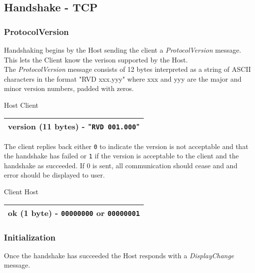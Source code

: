 \documentclass{article}
\begin{document}
    \subsection{Handshake - TCP}

    \subsubsection{ProtocolVersion}
    Handshaking begins by the Host sending the client a \emph{ProtocolVersion} message. This lets the Client know the verison supported by the Host.\\

    The \emph{ProtocolVersion} message consists of 12 bytes interpreted as a string of ASCII characters in the format "RVD xxx.yyy" where xxx and yyy are the major and minor version numbers, padded with zeros.

    \begin{center}
        Host \textrightarrow Client\\
        \begin{tabular}{|c|}
            \hline
            version (11 bytes) -
            "\texttt{RVD 001.000}" \\
            \hline
        \end{tabular}
    \end{center}

    The client replies back either \texttt{0} to indicate the version is not acceptable and that the handshake has failed or \texttt{1} if the version is acceptable to the client and the handshake as succeeded. If 0 is sent, all communication should cease and and error should be displayed to user.

    \begin{center}
        Client \textrightarrow Host\\
        \begin{tabular}{|c|}
            \hline
            ok (1 byte) -
            \texttt{00000000} or \texttt{00000001} \\
            \hline
        \end{tabular}
    \end{center}

    \subsubsection{Initialization}

    Once the handshake has succeeded the Host responds with a \emph{DisplayChange} message.
\end{document}
